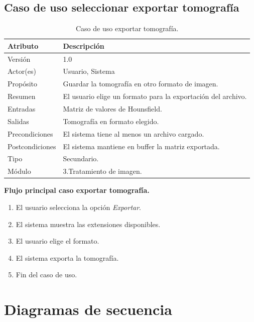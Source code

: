 \documentclass[12pt]{report}
\begin{document}
\subsection{Caso de uso seleccionar exportar tomografía}
\begin{table}[H]
\begin{center}
\begin{tabular}{p{30mm}p{80mm}}
\hline
Atributo & Descripción\\
\hline \hline 
Versión & 1.0\\
Actor(es) & Usuario, Sistema\\
Propósito & Guardar la tomografía en otro formato de imagen.\\
Resumen & El usuario elige un formato para la exportación del archivo.\\
Entradas & Matriz de valores de Hounsfield.\\
Salidas & Tomografía en formato elegido.\\
Precondiciones & El sistema tiene al menos un archivo cargado.\\
Postcondiciones & El sistema mantiene en buffer la matriz exportada.\\
Tipo & Secundario.\\
Módulo & 3.Tratamiento de imagen.\\
\hline \hline
\end{tabular}
\caption{Caso de uso exportar tomografía.}
\end{center}
\end{table}

\textbf{Flujo principal caso exportar tomografía. }
\begin{enumerate}
\item El usuario selecciona la opción \textit{Exportar}.
\item El sistema muestra las extensiones disponibles.
\item El usuario elige el formato.
\item El sistema exporta la tomografía.
\item Fin del caso de uso.
\end{enumerate}


\section{Diagramas de secuencia}
\end{document}
